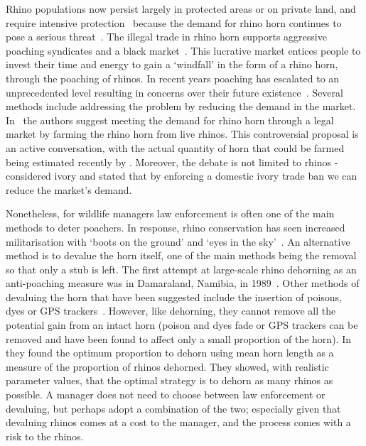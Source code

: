 \documentclass[10pt]{article}
\begin{document}
Rhino populations now persist largely in protected areas or on private land, and
require intensive protection~\cite{Ferreira2014} because the demand for rhino
horn continues to pose a serious threat~\cite{Amin2006}. The illegal trade in rhino
horn supports aggressive poaching syndicates and a black market~\cite{Nowell1992, Warchol2003}.
This lucrative market entices people to invest their time and energy to gain a
`windfall' in the form of a rhino horn, through the poaching of rhinos. In recent
years poaching has escalated to an unprecedented level resulting in concerns over
their future existence~\cite{Duan2013,Smith1993}. Several methods
include addressing the problem by reducing the demand in the market. In~\cite{Duan2013}
the authors suggest meeting the demand for rhino horn through a legal market by
farming the rhino horn from live rhinos. This controversial proposal is an active
conversation, with the actual quantity of horn that could be farmed being estimated
recently by \cite{Taylor2017}. Moreover, the debate is not limited to rhinos -
\cite{Harvey2017} considered ivory and stated that by enforcing a domestic ivory
trade ban we can reduce the market's demand.

Nonetheless, for wildlife managers law enforcement is often one of the main methods
to deter poachers.
In response, rhino conservation has seen increased  militarisation with `boots on the
ground' and `eyes in the sky'~\cite{duffy_st}. An alternative method is to
devalue the horn itself, one of the main  methods being the removal so that only
a stub is left. The first attempt at large-scale rhino dehorning as an anti-poaching
measure was in Damaraland, Namibia, in 1989~\cite{Milner1992}. Other methods
of devaluing the horn that have been suggested include
the insertion of poisons, dyes or GPS trackers~\cite{Gill2010,Smith1993}. However,
like dehorning, they cannot remove all the potential gain from an intact horn
(poison and dyes fade or GPS trackers can be removed and have been found to affect
only a small proportion of the horn).
In~\cite{Milner1992} they found the
optimum proportion to dehorn using mean horn length as a measure of the
proportion of rhinos dehorned. They showed, with realistic parameter values,
that the optimal strategy is to dehorn as many rhinos as possible.
A manager does not need to choose between law enforcement or devaluing, but
perhaps adopt a combination of the two; especially given that devaluing rhinos
comes at a cost to the manager, and the process comes with a risk to the rhinos.
\end{document}
